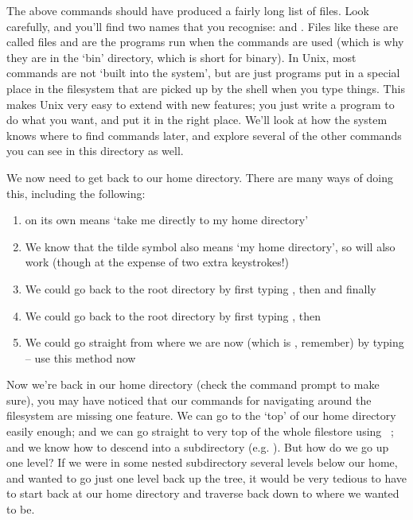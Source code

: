 \noindent The above commands should have produced  a fairly long list of files. Look carefully, and you'll find two names that you recognise:  and . Files like these are called  files and are the programs run when the commands are used  (which is why they are in the `bin' directory, which is short for binary). In Unix, most commands are not `built into the system', but are just programs put in a special place in the filesystem that are picked up by the shell when you type things. This makes Unix very easy to extend with new features; you just write a program to do what you want, and put it in the right place. We'll look at how the system knows where to find commands later, and explore several of the other commands you can see in this directory as well.

We now need to get back to our home directory.  There are many ways of doing this, including the following:

\begin{enumerate}
\item {} on its own means `take me directly to my home directory'
\item We know that the tilde symbol also means `my home directory', so  will also work (though at the expense of two extra keystrokes!)
\item We could go back to the root directory by first typing , then  and finally 
\item We could go back to the root directory by first typing , then 
\item We could go straight from where we are now (which is , remember) by typing  -- use this method now
\end{enumerate}

Now we're back in our home directory (check the command prompt to make sure), you may have noticed that our commands for navigating around the filesystem are missing one feature. We can go to the `top' of our home directory easily enough; and we can go straight to very top of the whole filestore using ~; and we know how to descend into a subdirectory (e.g. ). But how do we go up one level? If we were in some nested subdirectory several levels below our home, and wanted to go just one level back up the tree, it would be very tedious to have to start back at our home directory and traverse back down to where we wanted to be.

